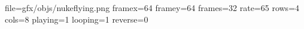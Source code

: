 file=gfx/objs/nukeflying.png
framex=64
framey=64
frames=32
rate=65
rows=4
cols=8
playing=1
looping=1
reverse=0

